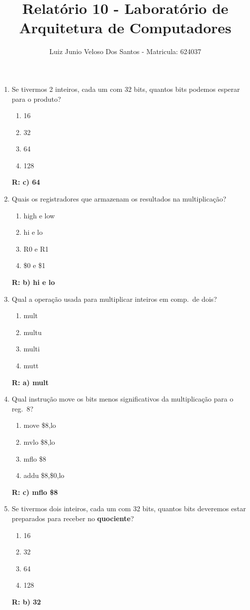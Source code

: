 \documentclass[a4paper,11pt,fleqn]{article}
\title{\vspace{-4cm}Relatório 10 - Laboratório de Arquitetura de Computadores}
\author{Luiz Junio Veloso Dos Santos - Matricula: 624037}
\begin{document}
 

\maketitle


\begin{enumerate}
    \item{Se tivermos 2 inteiros, cada um com 32 bits, quantos bits podemos esperar para o produto?}
        \begin{enumerate}
            \item{16}
            \item{32}
            \item{64}
            \item{128}
        \end{enumerate}
        \textbf{R: c) 64}

    \item{Quais os registradores que armazenam os resultados na multiplicação?}
        \begin{enumerate}
            \item{high e low}
            \item{hi e lo}
            \item{R0 e R1}
            \item{\$0 e \$1}
        \end{enumerate}
        \textbf{R: b) hi e lo}

    \item{Qual a operação usada para multiplicar inteiros em comp.\ de dois?}
        \begin{enumerate}
            \item{mult}
            \item{multu}
            \item{multi}
            \item{mutt}
        \end{enumerate}
        \textbf{R: a) mult}

    \item{Qual instrução move os bits menos significativos da multiplicação para o reg.\ 8?}
        \begin{enumerate}
            \item{move \$8,lo}
            \item{mvlo \$8,lo}
            \item{mflo \$8}
            \item{addu \$8,\$0,lo}
        \end{enumerate}
        \textbf{R: c) mflo \$8}
        \newpage
    \item{Se tivermos dois inteiros, cada um com 32 bits, quantos bits deveremos estar preparados para
            receber no \textbf{quociente}?}
        \begin{enumerate}
            \item{16}
            \item{32}
            \item{64}
            \item{128}
        \end{enumerate}
        \textbf{R: b) 32 }


\end{enumerate}
\end{document}

